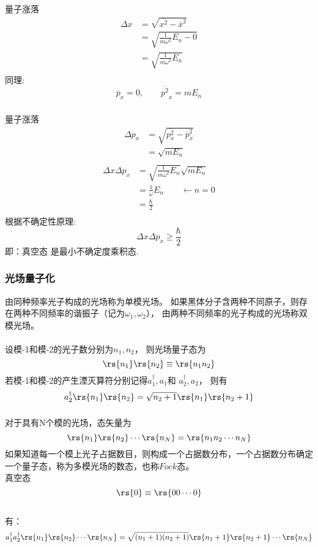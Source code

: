    \begin{frame}
       \frametitle{}
       量子涨落
       \[\begin{aligned}
           \Delta x  &= \sqrt{ \overline{x^2}- \overline{x}^2}  \\ 
           &= \sqrt{ \frac{1}{m\omega^2} E_n- 0}  \\ 
           &= \sqrt{ \frac{1}{m\omega^2} E_n}  \\ 
       \end{aligned} \]
        同理:
    \[\overline{p}_x =0, \qquad \overline{p^2}_x = m E_n\]
   \end{frame}
   
   \begin{frame}
    \frametitle{}

         量子涨落
         \[\begin{aligned}
           \Delta p_x  &= \sqrt{ \overline{p^2 _x}- \overline{p}_x ^2}  \\ 
             &= \sqrt{ m E_n}  \\ 
         \end{aligned} \]
         \[\begin{aligned}
           \Delta x \Delta p_x  &= \sqrt{ \frac{1}{m\omega^2} E_n} \sqrt{ m E_n} \\ 
           &= \frac{1}{\omega} E_n \qquad \leftarrow n=0\\ 
           &= \frac{\hbar}{2}  \\
         \end{aligned} \]
         根据不确定性原理: 
         \[ \Delta x \Delta p_x \geq  \frac{\hbar}{2}  \]
         即：真空态 是最小不确定度乘积态.
   \end{frame}


   \begin{frame}
    \frametitle{光场量子化}
    由同种频率光子构成的光场称为单模光场。 如果黑体分子含两种不同原子，则存在两种不同频率的谐振子（记为$\omega _1, \omega _2$），
    由两种不同频率的光子构成的光场称双模光场。\\
    ~~\\ 
    设模-1和模-2的光子数分别为$n_1, n_2$， 则光场量子态为
    $$\rs{n_1}\rs{n_2}\equiv\rs{n_1 n_2} $$
    若模-1和模-2的产生湮灭算符分别记得$a_1^\dagger,a_1$和 $a_2^\dagger,a_2$， 则有
    $$a_2^\dagger \rs{n_1}\rs{n_2} = \sqrt{n_2 +1} \rs{n_1}\rs{n_2 +1} $$
    \end{frame}
    
    \begin{frame}[label=current]
      \frametitle{}
      对于具有N个模的光场，态矢量为
      $$ \rs{n_1}\rs{n_2}\cdots \rs{n_N} = \rs{n_1n_2\cdots n_N}$$ 
      如果知道每一个模上光子占据数目，则构成一个占据数分布，一个占据数分布确定一个量子态，称为多模光场的数态，也称$Fock$态。\\
      真空态
      \[\rs{0}\equiv \rs{00\cdots 0} \]
      ~~\\ 
      有：
      $$a_1^\dagger a_2^\dagger \rs{n_1}\rs{n_2}\cdots \rs{n_N} = \sqrt{(n_1 +1)(n_2 +1)}\rs{n_1 +1}\rs{n_2 +1} \cdots \rs{n_N}$$
    \end{frame} 

